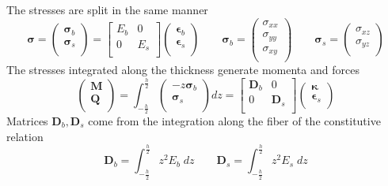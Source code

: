 \documentclass{beamer}
\begin{document}
\begin{frame}{}
The stresses are split in the same manner
\begin{equation*}
\bm{\sigma} = 
\begin{pmatrix}
\bm{\sigma}_b \\
\bm{\sigma}_s \\
\end{pmatrix} = 
\begin{bmatrix}
E_b & 0 \\
0 & E_s \\
\end{bmatrix}
\begin{pmatrix}
\bm{\epsilon}_b \\
\bm{\epsilon}_s \\
\end{pmatrix}
\qquad
\bm{\sigma}_b = 
\begin{pmatrix}
\sigma_{xx} \\
\sigma_{yy} \\
\sigma_{xy} \\
\end{pmatrix}
\qquad
\bm{\sigma}_s = 
\begin{pmatrix}
\sigma_{xz} \\
\sigma_{yz} \\
\end{pmatrix}
\end{equation*}
The stresses integrated along the thickness generate momenta and forces
\begin{equation*}
\begin{pmatrix}
\bm{M} \\
\bm{Q} \\
\end{pmatrix} = \int_{-\frac{h}{2} }^{\frac{h}{2}}
\begin{pmatrix}
-z \bm{\sigma}_b \\
\bm{\sigma}_s \\
\end{pmatrix} dz=
\begin{bmatrix}
\bm{D}_b & 0 \\
0 & \bm{D}_s \\
\end{bmatrix}
\begin{pmatrix}
\bm{\kappa} \\
\bm{\epsilon}_s \\
\end{pmatrix}
\end{equation*}
Matrices $\bm{D}_b, \bm{D}_s$ come from the integration along the fiber of the constitutive relation
\begin{equation*}
\bm{D}_b = \int_{-\frac{h}{2} }^{\frac{h}{2}} z^2 E_b \; dz \qquad
\bm{D}_s = \int_{-\frac{h}{2} }^{\frac{h}{2}} z^2 E_s \; dz
\end{equation*}

\end{frame}
\end{document}
